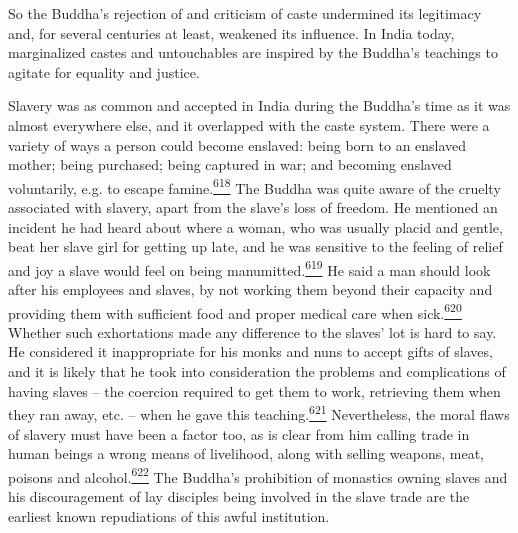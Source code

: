 So the Buddha's rejection of and criticism of caste undermined its
legitimacy and, for several centuries at least, weakened its influence.
In India today, marginalized castes and untouchables are inspired by the
Buddha's teachings to agitate for equality and justice.

Slavery was as common and accepted in India during the Buddha's time as
it was almost everywhere else, and it overlapped with the caste system.
There were a variety of ways a person could become enslaved: being born
to an enslaved mother; being purchased; being captured in war; and
becoming enslaved voluntarily, e.g. to escape
famine.\label{footprints_split_015.html_fnref618}\hyperref[footprints_split_025.htmlux5cux23fn618]{\textsuperscript{618}}
The Buddha was quite aware of the cruelty associated with slavery, apart
from the slave's loss of freedom. He mentioned an incident he had heard
about where a woman, who was usually placid and gentle, beat her slave
girl for getting up late, and he was sensitive to the feeling of relief
and joy a slave would feel on being
manumitted.\label{footprints_split_015.html_fnref619}\hyperref[footprints_split_025.htmlux5cux23fn619]{\textsuperscript{619}}
He said a man should look after his employees and slaves, by not working
them beyond their capacity and providing them with sufficient food and
proper medical care when
sick.\label{footprints_split_015.html_fnref620}\hyperref[footprints_split_025.htmlux5cux23fn620]{\textsuperscript{620}}
Whether such exhortations made any difference to the slaves' lot is hard
to say. He considered it inappropriate for his monks and nuns to accept
gifts of slaves, and it is likely that he took into consideration the
problems and complications of having slaves -- the coercion required to
get them to work, retrieving them when they ran away, etc. -- when he
gave this
teaching.\label{footprints_split_015.html_fnref621}\hyperref[footprints_split_025.htmlux5cux23fn621]{\textsuperscript{621}}
Nevertheless, the moral flaws of slavery must have been a factor too, as
is clear from him calling trade in human beings a wrong means of
livelihood, along with selling weapons, meat, poisons and
alcohol.\label{footprints_split_015.html_fnref622}\hyperref[footprints_split_025.htmlux5cux23fn622]{\textsuperscript{622}}
The Buddha's prohibition of monastics owning slaves and his
discouragement of lay disciples being involved in the slave trade are
the earliest known repudiations of this awful institution.

